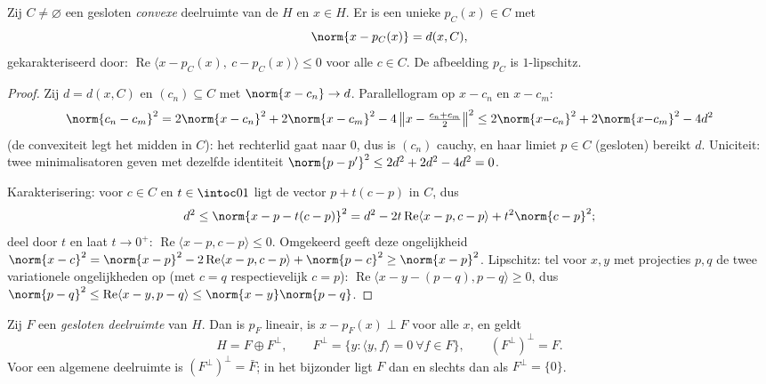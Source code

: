 \begin{theorem}
\label{thm:b3:hilbert:projection}
Zij $C \neq \varnothing$ een gesloten \emph{convexe} deelruimte
van de  $H$ en $x \in H$. Er is een unieke $p_C(x)
\in C$ met
\[
\norm{x - p_C(x)} = d(x, C),
\]
gekarakteriseerd door: $\operatorname{Re}\langle x - p_C(x),\ c -
p_C(x)\rangle \leq 0$ voor alle $c \in C$. De afbeelding $p_C$ is
$1$-lipschitz.
\end{theorem}

\begin{proof}
Zij $d = d(x, C)$ en $(c_n) \subseteq C$ met $\norm{x - c_n} \to
d$. Parallellogram op $x - c_n$ en $x - c_m$:
\[
\norm{c_n - c_m}^2 = 2\norm{x - c_n}^2 + 2\norm{x - c_m}^2 -
4\,\bigl\|x - \tfrac{c_n + c_m}2\bigr\|^2
\leq 2\norm{x{-}c_n}^2 + 2\norm{x{-}c_m}^2 - 4d^2
\]
(de convexiteit legt het midden in $C$): het rechterlid gaat naar
$0$, dus is $(c_n)$ cauchy, en haar limiet $p \in C$ (gesloten)
bereikt $d$. Uniciteit: twee minimalisatoren geven met dezelfde
identiteit $\norm{p - p'}^2 \leq 2d^2 + 2d^2 - 4d^2 = 0$.

Karakterisering: voor $c \in C$ en $t \in \intoc01$ ligt de
vector $p + t(c - p)$ in $C$, dus
\[
d^2 \leq \norm{x - p - t(c-p)}^2
= d^2 - 2t\operatorname{Re}\langle x - p, c - p\rangle +
t^2\norm{c-p}^2 ;
\]
deel door $t$ en laat $t \to 0^+$: $\operatorname{Re}\langle x -
p, c - p\rangle \leq 0$. Omgekeerd geeft deze ongelijkheid
$\norm{x - c}^2 = \norm{x - p}^2 - 2\operatorname{Re}\langle x -
p, c - p\rangle + \norm{p - c}^2 \geq \norm{x-p}^2$.
Lipschitz: tel voor $x, y$ met projecties $p, q$ de twee
variationele ongelijkheden op (met $c = q$ respectievelijk $c =
p$): $\operatorname{Re}\langle x - y - (p - q), p - q\rangle \geq
0$, dus $\norm{p - q}^2 \leq \operatorname{Re}\langle x - y, p -
q\rangle \leq \norm{x - y}\norm{p - q}$.
\end{proof}

\begin{theorem}
\label{thm:b3:hilbert:decomposition}
Zij $F$ een \emph{gesloten deelruimte} van $H$. Dan is $p_F$
lineair, is $x - p_F(x) \perp F$ voor alle $x$, en
geldt
\[
H = F \oplus F^\perp,
\qquad F^\perp = \{y : \langle y, f\rangle = 0\ \forall f\in
F\},
\qquad (F^\perp)^\perp = F .
\]
Voor een algemene deelruimte is $(F^\perp)^\perp = \bar F$; in
het bijzonder ligt $F$  dan en slechts dan als $F^\perp =
\{0\}$.
\end{theorem}

